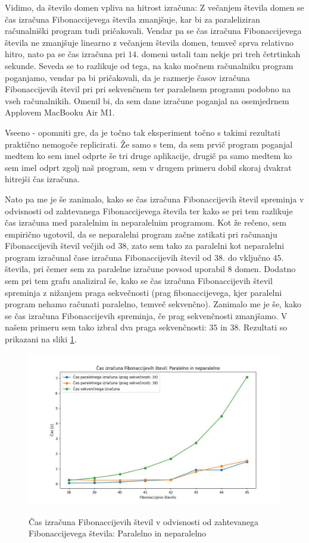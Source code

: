 \documentclass[mat1, tisk]{fmfdelo}
\begin{document}
Vidimo, da število domen vpliva na hitrost izračuna: Z večanjem števila domen se čas izračuna Fibonaccijevega števila
zmanjšuje, kar bi za paraleliziran računalniški program tudi pričakovali. Vendar pa se čas izračuna Fibonaccijevega
števila ne zmanjšuje linearno z večanjem števila domen, temveč sprva relativno hitro, nato pa se čas izračuna pri $14.$
domeni ustali tam nekje pri treh četrtinkah sekunde. Seveda se to razlikuje od tega, na kako močnem računalniku
program poganjamo, vendar pa bi pričakovali, da je razmerje časov izračuna Fibonaccijevih števil pri pri sekvenčnem
ter paralelnem programu podobno na vseh računalnikih. Omenil bi, da sem dane izračune poganjal na osemjedrnem Applovem
MacBooku Air M1. 

Vseeno - opomniti gre, da je točno tak eksperiment točno s takimi rezultati praktično nemogoče replicirati.
Že samo s tem, da sem prvič program poganjal medtem ko sem imel odprte še tri druge aplikacije, 
drugič pa samo medtem ko sem imel odprt zgolj naš program, sem v drugem primeru dobil skoraj dvakrat hitrejši čas izračuna.

Nato pa me je še zanimalo, kako se čas izračuna Fibonaccijevih števil spreminja v odvisnosti od zahtevanega
Fibonaccijevega števila ter kako se pri tem razlikuje čas izračuna med paralelnim in neparalelnim programom.
Kot že rečeno, sem empirično ugotovil, da se neparalelni program začne zatikati pri računanju Fibonaccijevih števil
večjih od $38$, zato sem tako za paralelni kot neparalelni program izračunal čase izračuna Fibonaccijevih števil od $38.$
do vključno $45.$ števila, pri čemer sem za paralelne izračune povsod uporabil $8$ domen. Dodatno sem pri tem grafu
analiziral še, kako se čas izračuna Fibonaccijevih števil spreminja z nižanjem praga sekvečnosti (prag fibonaccijevega,
kjer paralelni program nehamo računati paralelno, temveč sekvenčno). Zanimalo me je še, kako se čas izračuna
Fibonaccijevih spreminja, če prag sekvenčnosti zmanjšamo. V našem primeru sem tako izbral dva praga sekvenčnosti:
$35$ in $38$. Rezultati so prikazani na sliki \ref{fig:fib_par_v_odvisnosti_od_n}.

\begin{figure}[h!]
  \centering
  \caption{Čas izračuna Fibonaccijevih števil v odvisnosti od zahtevanega Fibonaccijevega števila: Paralelno in neparalelno}
  \includegraphics[width=15cm]{slike/fib_par_v_odvisnosti_od_n.jpg}
  \label{fig:fib_par_v_odvisnosti_od_n}
\end{figure}
\end{document}
